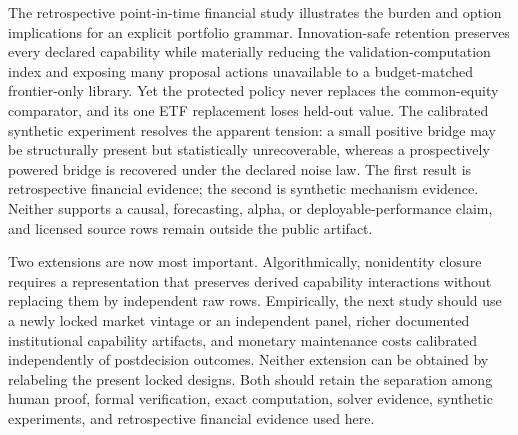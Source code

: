 The retrospective point-in-time financial study illustrates the burden and
option implications for an explicit portfolio grammar. Innovation-safe
retention preserves every declared capability while materially reducing the
validation-computation index and exposing many proposal actions unavailable to
a budget-matched frontier-only library. Yet the protected policy never replaces
the common-equity comparator, and its one ETF replacement loses held-out value.
The calibrated synthetic experiment resolves the apparent tension: a small
positive bridge may be structurally present but statistically unrecoverable,
whereas a prospectively powered bridge is recovered under the declared noise
law. The first result is retrospective financial evidence; the second is
synthetic mechanism evidence. Neither supports a causal, forecasting, alpha,
or deployable-performance claim, and licensed source rows remain outside the
public artifact.

Two extensions are now most important. Algorithmically, nonidentity closure
requires a representation that preserves derived capability interactions
without replacing them by independent raw rows. Empirically, the next study
should use a newly locked market vintage or an independent panel, richer
documented institutional capability artifacts, and monetary maintenance costs
calibrated independently of postdecision outcomes. Neither extension can be obtained by relabeling
the present locked designs. Both should retain the separation among human
proof, formal verification, exact computation, solver evidence, synthetic
experiments, and retrospective financial evidence used here.
